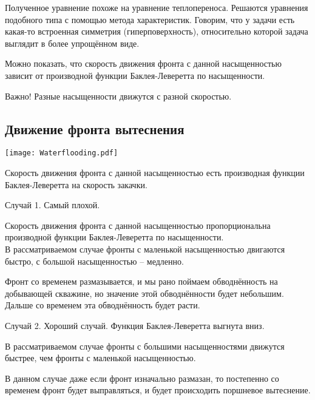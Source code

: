 \documentclass[main.tex]{subfiles}
\begin{document}
Полученное уравнение похоже на уравнение теплопереноса. Решаются уравнения подобного типа с помощью метода характеристик. Говорим, что у задачи есть какая-то встроенная симметрия (гиперповерхность), относительно которой задача выглядит в более упрощённом виде. 


Можно показать, что скорость движения фронта с данной насыщенностью зависит от производной функции Баклея-Леверетта по насыщенности.

Важно! Разные насыщенности движутся с разной скоростью.

\subsection{Движение фронта вытеснения}

\texttt{[image: Waterflooding.pdf]}

Скорость движения фронта с данной насыщенностью есть производная функции Баклея-Леверетта на скорость закачки.

Случай 1. Самый плохой.


Скорость движения фронта с данной насыщенностью пропорциональна производной функции Баклея-Леверетта по насыщенности.\\

В рассматриваемом случае фронты с маленькой насыщенностью двигаются быстро, с большой насыщенностью -- медленно.

Фронт со временем размазывается, и мы рано поймаем обводнённость на добывающей скважине, но значение этой обводнённости будет небольшим. Дальше со временем эта обводнённость будет расти.


Случай 2. Хороший случай. Функция Баклея-Леверетта выгнута вниз.

В рассматриваемом случае фронты с большими насыщенностями движутся быстрее, чем фронты с маленькой насыщенностью.


В данном случае даже если фронт изначально размазан, то постепенно со временем фронт будет выправляться, и будет происходить поршневое вытеснение.
\end{document}
